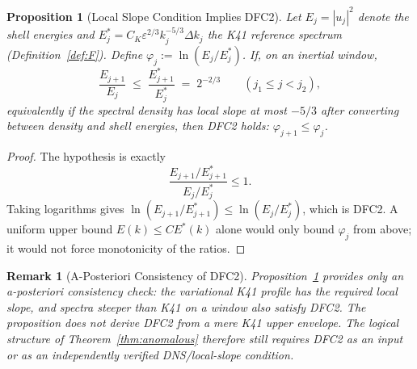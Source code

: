 \documentclass[12pt,a4paper]{article}
\theoremstyle{breakdef}
\theoremstyle{breakplain}
\newtheorem{proposition}[definition]{Proposition}
\theoremstyle{breakdef}
\newtheorem{remark}[definition]{Remark}
\begin{document}
\begin{proposition}[Local Slope Condition Implies DFC2]\label{prop:dfc2-from-k41}
Let $E_j = |u_j|^2$ denote the shell energies and
$E_j^* = C_K \varepsilon^{2/3} k_j^{-5/3}\Delta k_j$ the K41 reference
spectrum (Definition~\ref{def:F}). Define
$\varphi_j := \ln(E_j / E_j^*)$. If, on an inertial window,
\[
  \frac{E_{j+1}}{E_j}
  \;\le\;
  \frac{E_{j+1}^*}{E_j^*}
  \;=\;2^{-2/3}
  \qquad (j_1 \le j < j_2),
\]
equivalently if the spectral density has local slope at most $-5/3$
after converting between density and shell energies, then DFC2 holds:
$\varphi_{j+1}\le\varphi_j$.
\end{proposition}

\begin{proof}
The hypothesis is exactly
\[
  \frac{E_{j+1}/E_{j+1}^*}{E_j/E_j^*}\le 1.
\]
Taking logarithms gives
$\ln(E_{j+1}/E_{j+1}^*)\le \ln(E_j/E_j^*)$, which is DFC2. A uniform
upper bound $E(k)\le C E^*(k)$ alone would only bound $\varphi_j$ from
above; it would not force monotonicity of the ratios.
\end{proof}

\begin{remark}[A-Posteriori Consistency of DFC2]\label{rem:empirical-reduction}
Proposition~\ref{prop:dfc2-from-k41} provides only an
\emph{a-posteriori consistency check}: the variational K41 profile has the
required local slope, and spectra steeper than K41 on a window also satisfy
DFC2. The proposition does not derive DFC2 from a mere K41 upper envelope.
The logical structure of Theorem~\ref{thm:anomalous} therefore still requires
DFC2 as an input or as an independently verified DNS/local-slope condition.
\end{remark}
\end{document}
